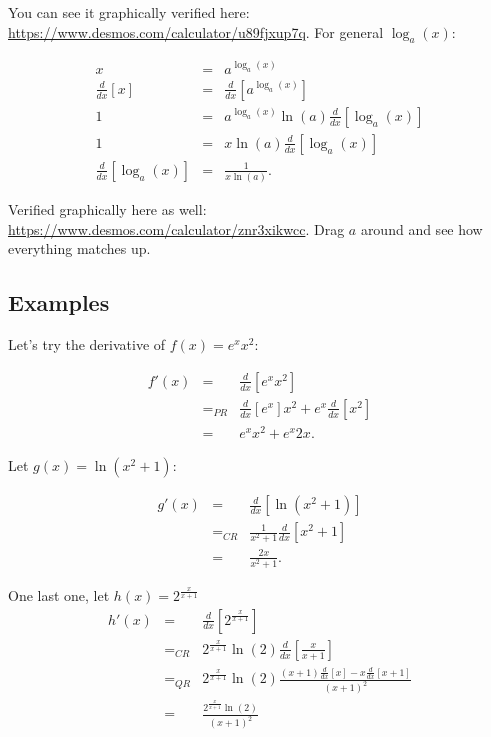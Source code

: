 You can see it graphically verified here: \url{https://www.desmos.com/calculator/u89fjxup7q}.  For general $\log_a(x)$:


\begin{eqnarray*}
x&=&a^{\log_a(x)}\\
\frac{d}{dx}[x]&=&\frac{d}{dx}[a^{\log_a(x)}]\\
1&=&a^{\log_a(x)}\ln(a)\frac{d}{dx}[\log_a(x)]\\
1&=&x\ln(a)\frac{d}{dx}[\log_a(x)]\\
\frac{d}{dx}[\log_a(x)]&=&\frac{1}{x\ln(a)}.
\end{eqnarray*}


Verified graphically here as well: \url{https://www.desmos.com/calculator/znr3xikwcc}.  Drag $a$ around and see how everything matches up.

\subsection{Examples}


Let's try the derivative of $f(x)=e^{x}x^2$:

\begin{eqnarray*}
f'(x)&=&\frac{d}{dx}[e^xx^2]\\
&=_{PR}&\frac{d}{dx}[e^x]x^2+e^x\frac{d}{dx}[x^2]\\
&=&e^xx^2+e^x2x.
\end{eqnarray*}

Let $g(x)=\ln(x^2+1)$:

\begin{eqnarray*}
g'(x)&=&\frac{d}{dx}[\ln(x^2+1)]\\
&=_{CR}&\frac{1}{x^2+1}\frac{d}{dx}[x^2+1]\\
&=&\frac{2x}{x^2+1}.
\end{eqnarray*}

One last one, let $h(x)=2^{\frac{x}{x+1}}$\\

\begin{eqnarray*}
h'(x)&=&\frac{d}{dx}[2^{\frac{x}{x+1}}]\\
&=_{CR}&2^{\frac{x}{x+1}}\ln(2)\frac{d}{dx}[\frac{x}{x+1}]\\
&=_{QR}&2^{\frac{x}{x+1}}\ln(2)\frac{(x+1)\frac{d}{dx}[x]-x\frac{d}{dx}[x+1]}{(x+1)^2}\\
&=&\frac{2^{\frac{x}{x+1}}\ln(2)}{(x+1)^2}
\end{eqnarray*}



























